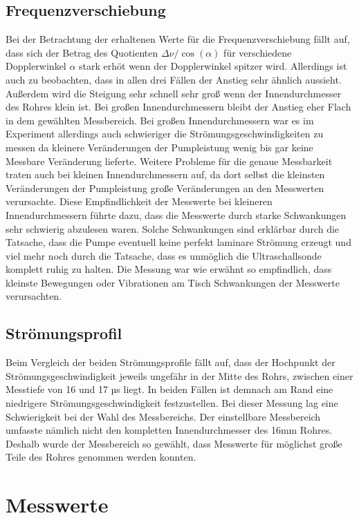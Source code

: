 \documentclass[titlepage=firstcover, captions=tableheading]{scrartcl}
\begin{document}
\subsection{Frequenzverschiebung}

\noindent Bei der Betrachtung der erhaltenen Werte für die Frequenzverschiebung fällt auf, dass sich der Betrag des Quotienten $\Delta \nu / \cos(\alpha)$ für verschiedene Dopplerwinkel $\alpha$ stark erhöt wenn der Dopplerwinkel spitzer wird. Allerdings ist auch zu beobachten, dass in allen drei Fällen der Anstieg sehr ähnlich aussieht. Außerdem wird die Steigung sehr schnell sehr groß wenn der Innendurchmesser des Rohres klein ist. Bei großen Innendurchmessern bleibt der Anstieg eher Flach in dem gewählten Messbereich. 
\noindent Bei großen Innendurchmessern war es im Experiment allerdings auch schwieriger die Strömungsgeschwindigkeiten zu messen da kleinere Veränderungen der Pumpleistung wenig bis gar keine Messbare Veränderung lieferte.
Weitere Probleme für die genaue Messbarkeit traten auch bei kleinen Innendurchmessern auf, da dort selbst die kleinsten Veränderungen der Pumpleistung große Veränderungen an den Messwerten verursachte. Diese Empfindlichkeit der Messwerte bei kleineren Innendurchmessern führte dazu, dass die Messwerte durch starke Schwankungen sehr schwierig abzulesen waren. Solche Schwankungen sind erklärbar durch die Tatsache, dass die Pumpe eventuell keine perfekt laminare Strömung erzeugt und viel mehr noch durch die Tatsache, dass es unmöglich die Ultraschallsonde komplett ruhig zu halten. Die Messung war wie erwähnt so empfindlich, dass kleinste Bewegungen oder Vibrationen am Tisch Schwankungen der Messwerte verursachten.

\subsection{Strömungsprofil}

Beim Vergleich der beiden Strömungsprofile fällt auf, dass der Hochpunkt der Strömungsgeschwindigkeit jeweils ungefähr in der Mitte des Rohrs, zwischen einer Messtiefe von 16 und 17 µs liegt. In beiden Fällen ist demnach am Rand eine niedrigere Strömungsgeschwindigkeit festzustellen. 
Bei dieser Messung lag eine Schwierigkeit bei der Wahl des Messbereichs. Der einstellbare Messbereich umfasste nämlich nicht den kompletten Innendurchmesser des 16mm Rohres. Deshalb wurde der Messbereich so gewählt, dass Messwerte für möglichst große Teile des Rohres genommen werden konnten.  

\section{Messwerte}
\end{document}

